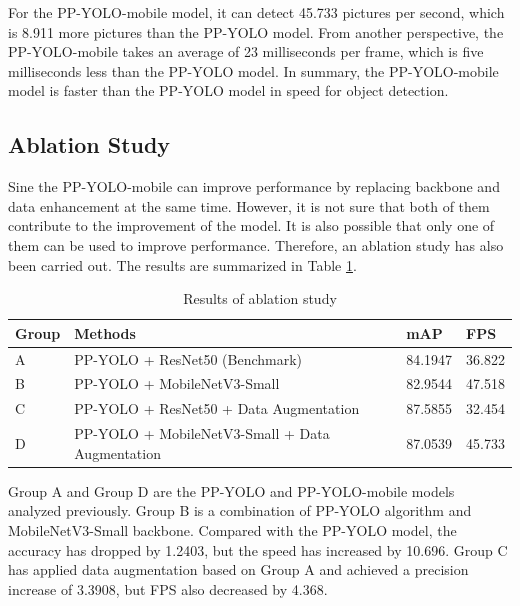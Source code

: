 \documentclass[sensors,article,submit,moreauthors,pdftex]{Definitions/mdpi}
\begin{document}
\begin{paracol}{2}
\linenumbers
\switchcolumn



For the PP-YOLO-mobile model, it can detect 45.733 pictures per second, which is 8.911 more pictures than the PP-YOLO model. From another perspective, the PP-YOLO-mobile takes an average of 23 milliseconds per frame, which is five milliseconds less than the PP-YOLO model. In summary, the PP-YOLO-mobile model is faster than the PP-YOLO model in speed for object detection.



\subsection{Ablation Study}

Sine the PP-YOLO-mobile can improve performance by replacing backbone and data enhancement at the same time. However, it is not sure that both of them contribute to the improvement of the model. It is also possible that only one of them can be used to improve performance. Therefore, an ablation study has also been carried out. The results are summarized in Table \ref{tbl:Results of ablation study}.


\begin{table}[htbp]
\centering
\caption{Results of ablation study}
\begin{tabular}{llll} 
\toprule
\textbf{Group}&\textbf{Methods}&\textbf{mAP}&\textbf{FPS}\\
\midrule
A& PP-YOLO + ResNet50 (Benchmark) &84.1947 & 36.822\\
\cmidrule(r){1-4}
B& PP-YOLO + MobileNetV3-Small &82.9544 & 47.518\\
C& PP-YOLO + ResNet50 + Data Augmentation & 87.5855 & 32.454\\
D& PP-YOLO + MobileNetV3-Small + Data Augmentation & 87.0539& 45.733\\
\bottomrule
\end{tabular}
\label{tbl:Results of ablation study}
\end{table}

Group A and Group D are the PP-YOLO and PP-YOLO-mobile models analyzed previously. Group B is a combination of PP-YOLO algorithm and MobileNetV3-Small backbone. Compared with the PP-YOLO model, the accuracy has dropped by 1.2403, but the speed has increased by 10.696. Group C has applied data augmentation based on Group A and achieved a precision increase of 3.3908, but FPS also decreased by 4.368.


\end{paracol}
\end{document}
